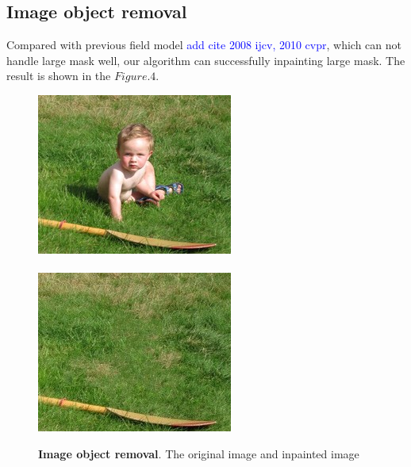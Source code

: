 \subsection*{Image object removal}
Compared with previous field model \etal\cite{} \textcolor{blue}{add cite 2008 ijcv, 2010 cvpr}, which can not handle large mask well, our algorithm can successfully inpainting large mask. The result is shown in the $Figure.4$. 
\begin{figure}
	\centering
	\includegraphics[width=0.9\linewidth]{kid.jpg}\\\ \\
	\includegraphics[width=0.9\linewidth]{kid_result.jpg}
	\caption{\textbf{Image object removal}. The original image and inpainted image}
\end{figure}

